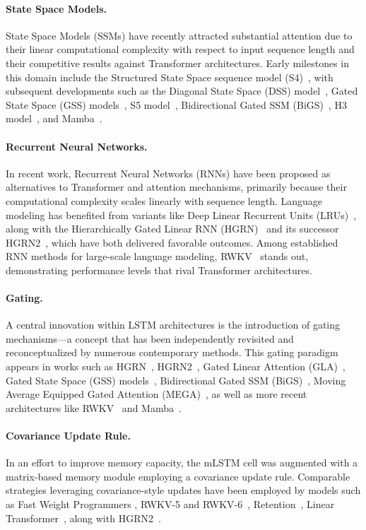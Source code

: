 \paragraph{State Space Models.} State Space Models (SSMs) have recently attracted substantial attention due to their linear computational complexity with respect to input sequence length and their competitive results against Transformer architectures. Early milestones in this domain include the Structured State Space sequence model (S4)~\citep{Gu:21}, with subsequent developments such as the Diagonal State Space (DSS) model~\citep{Gupta:22}, Gated State Space (GSS) models~\citep{Mehta:22}, S5 model~\citep{Smith:22}, Bidirectional Gated SSM (BiGS)~\citep{Wang:22}, H3 model~\citep{Fu:23}, and Mamba~\citep{Gu:24arxiv}.

\paragraph{Recurrent Neural Networks.} In recent work, Recurrent Neural Networks (RNNs) have been proposed as alternatives to Transformer and attention mechanisms, primarily because their computational complexity scales linearly with sequence length. Language modeling has benefited from variants like Deep Linear Recurrent Units (LRUs)~\citep{Orvieto:23, De:24arxiv}, along with the Hierarchically Gated Linear RNN (HGRN)~\citep{Qin:23} and its successor HGRN2~\citep{Qin:24arxiv}, which have both delivered favorable outcomes. Among established RNN methods for large-scale language modeling, RWKV~\citep{Peng:23arxivshort,Peng:24arxivshort} stands out, demonstrating performance levels that rival Transformer architectures.

\paragraph{Gating.}
A central innovation within LSTM architectures is the introduction of gating mechanisms—a concept that has been independently revisited and reconceptualized by numerous contemporary methods. This gating paradigm appears in works such as HGRN~\citep{Qin:23}, HGRN2~\citep{Qin:24arxiv}, Gated Linear Attention (GLA)~\citep{Yang:23arxiv}, Gated State Space (GSS) models~\citep{Mehta:22}, Bidirectional Gated SSM (BiGS)~\citep{Wang:22}, Moving Average Equipped Gated Attention (MEGA)~\citep{Ma:22}, as well as more recent architectures like RWKV~\citep{Peng:23arxivshort} and Mamba~\citep{Gu:24arxiv}.

\paragraph{Covariance Update Rule.}
In an effort to improve memory capacity, the mLSTM cell was augmented with a matrix-based memory module employing a covariance update rule. Comparable strategies leveraging covariance-style updates have been employed by models such as Fast Weight Programmers \citep{Schmidhuber:92ncfastweights,Schlag:21}, RWKV-5 and RWKV-6~\citep{Peng:24arxivshort}, Retention~\citep{Sun:23arxiv}, Linear Transformer~\citep{Katharopoulos:20}, along with HGRN2~\citep{Qin:24arxiv}.

